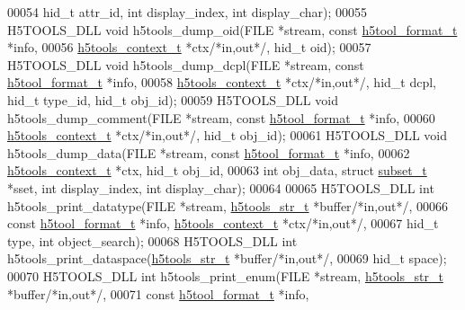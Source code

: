 \begin{DoxyCode}
00054                             hid\_t attr\_id, \textcolor{keywordtype}{int} display\_index, \textcolor{keywordtype}{int} display\_char);
00055 H5TOOLS\_DLL \textcolor{keywordtype}{void}    h5tools\_dump\_oid(FILE *stream, \textcolor{keyword}{const} \hyperlink{structh5tool__format__t}{h5tool\_format\_t} *info,
00056                             \hyperlink{structh5tools__context__t}{h5tools\_context\_t} *ctx\textcolor{comment}{/*in,out*/}, hid\_t oid);
00057 H5TOOLS\_DLL \textcolor{keywordtype}{void}    h5tools\_dump\_dcpl(FILE *stream, \textcolor{keyword}{const} \hyperlink{structh5tool__format__t}{h5tool\_format\_t} *info,
00058                             \hyperlink{structh5tools__context__t}{h5tools\_context\_t} *ctx\textcolor{comment}{/*in,out*/}, hid\_t dcpl, hid\_t type\_id, 
      hid\_t obj\_id);
00059 H5TOOLS\_DLL \textcolor{keywordtype}{void}    h5tools\_dump\_comment(FILE *stream, \textcolor{keyword}{const} \hyperlink{structh5tool__format__t}{h5tool\_format\_t} *info,
00060                             \hyperlink{structh5tools__context__t}{h5tools\_context\_t} *ctx\textcolor{comment}{/*in,out*/}, hid\_t obj\_id);
00061 H5TOOLS\_DLL \textcolor{keywordtype}{void}    h5tools\_dump\_data(FILE *stream, \textcolor{keyword}{const} \hyperlink{structh5tool__format__t}{h5tool\_format\_t} *info,
00062                             \hyperlink{structh5tools__context__t}{h5tools\_context\_t} *ctx, hid\_t obj\_id,
00063                             \textcolor{keywordtype}{int} obj\_data, \textcolor{keyword}{struct} \hyperlink{structsubset__t}{subset\_t} *sset, \textcolor{keywordtype}{int} display\_index, \textcolor{keywordtype}{int} 
      display\_char);
00064 
00065 H5TOOLS\_DLL \textcolor{keywordtype}{int}     h5tools\_print\_datatype(FILE *stream, \hyperlink{structh5tools__str__t}{h5tools\_str\_t} *buffer\textcolor{comment}{/*in,out*/},
00066                             \textcolor{keyword}{const} \hyperlink{structh5tool__format__t}{h5tool\_format\_t} *info, 
      \hyperlink{structh5tools__context__t}{h5tools\_context\_t} *ctx\textcolor{comment}{/*in,out*/},
00067                             hid\_t type, \textcolor{keywordtype}{int} object\_search);
00068 H5TOOLS\_DLL \textcolor{keywordtype}{int}     h5tools\_print\_dataspace(\hyperlink{structh5tools__str__t}{h5tools\_str\_t} *buffer\textcolor{comment}{/*in,out*/},
00069                             hid\_t space);
00070 H5TOOLS\_DLL \textcolor{keywordtype}{int}     h5tools\_print\_enum(FILE *stream, \hyperlink{structh5tools__str__t}{h5tools\_str\_t} *buffer\textcolor{comment}{/*in,out*/},
00071                             \textcolor{keyword}{const} \hyperlink{structh5tool__format__t}{h5tool\_format\_t} *info, 

\end{DoxyCode}

